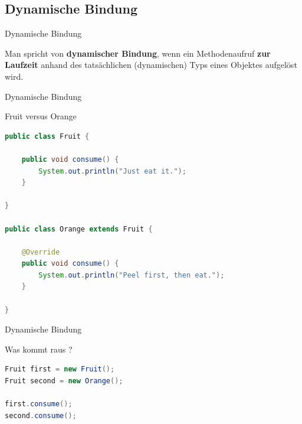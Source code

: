 \documentclass[18pt]{beamer}
\begin{document}
\subsection{Dynamische Bindung}

\begin{frame}{Dynamische Bindung}
    \begin{block}{}
        Man spricht von \textbf{dynamischer Bindung}, wenn ein Methodenaufruf \textbf{zur Laufzeit} anhand
        des tatsächlichen (dynamischen) Typs eines Objektes aufgelöst wird.
    \end{block}

\end{frame}


\begin{frame}[fragile]{Dynamische Bindung}
    \begin{exampleblock}{Fruit versus Orange}
        \begin{lstlisting}[language=Java,basicstyle=\scriptsize]
public class Fruit {

    public void consume() {
        System.out.println("Just eat it.");
    }

}

public class Orange extends Fruit {

    @Override
    public void consume() {
        System.out.println("Peel first, then eat.");
    }

}
        \end{lstlisting}

    \end{exampleblock}

\end{frame}

\begin{frame}[fragile]{Dynamische Bindung}
    \begin{exampleblock}{Was kommt raus ?}
        \begin{lstlisting}[language=Java]
Fruit first = new Fruit();
Fruit second = new Orange();

first.consume();
second.consume();
        \end{lstlisting}

    \end{exampleblock}

\end{frame}
\end{document}
